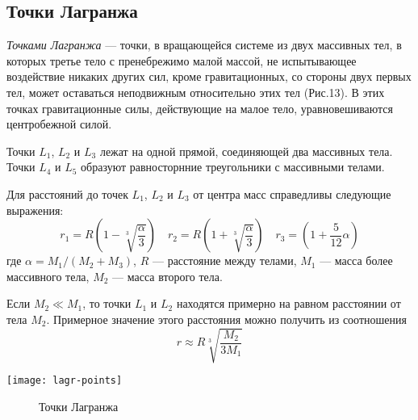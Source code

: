 \subsection{Точки Лагранжа}

{\itshape Точками Лагранжа} --- точки, в вращающейся системе из двух
массивных тел, в которых третье тело с пренебрежимо 
малой массой, не испытывающее воздействие никаких 
других сил, кроме гравитационных, со стороны двух 
первых тел, может оставаться неподвижным относительно 
этих тел (Рис.13). В этих точках гравитационные силы, действующие на малое тело, уравновешиваются центробежной силой.

Точки $L_1$, $L_2$ и $L_3$ лежат на одной прямой, 
соединяющей два массивных тела. Точки $L_4$ и $L_5$ 
образуют равносторнние треугольники с массивными 
телами.

Для расстояний до точек $L_1$, $L_2$ и $L_3$ от 
центра масс справедливы следующие выражения:
\begin{equation}r_1=R\left(1-\sqrt[3]{\frac{\alpha}
{3}}\right) \quad r_2=R\left(1+\sqrt[3]{\frac{\alpha}
{3}}\right) \quad r_3=\left(1+\frac{5}{12}\alpha\right)
\end{equation}
где $\alpha=M_1/(M_2+M_3)$, $R$ --- расстояние между 
телами, $M_1$ --- масса более массивного тела, $M_2$
 --- масса второго тела.

Если $M_2\ll M_1$, то точки $L_1$ и $L_2$ находятся 
примерно на равном расстоянии от тела $M_2$. 
Примерное значение этого расстояния можно получить
из соотношения
\begin{equation}r\approx R\sqrt[3]{\frac{M_2}{3M_1}}
\end{equation}
\begin{center}
\texttt{[image: lagr-points]}
\begin{figure}[h!]
\caption{Точки Лагранжа}
\end{figure}
\end{center}